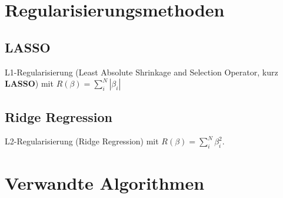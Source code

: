 \section{Regularisierungsmethoden}
\subsection{LASSO}
L1-Regularisierung (Least Absolute Shrinkage and Selection Operator, kurz \textbf{LASSO}) mit $R(\beta) = \sum_{i}^N|\beta_i|$
\subsection{Ridge Regression}
L2-Regularisierung (Ridge Regression) mit $R(\beta)= \sum_{i}^N \beta_i^2$.
\section{Verwandte Algorithmen}